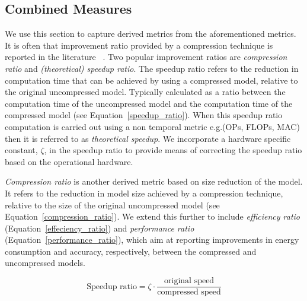 \subsection{Combined Measures} \label{combined_measures}
We use this section to capture derived metrics from the aforementioned metrics.%
%
It is often that improvement ratio provided by a compression technique is reported in the literature ~\cite{He2018,Blalock2018,Menghani2023}. Two popular improvement ratios are \textit{compression ratio} and \textit{(theoretical) speedup ratio}.
%
The speedup ratio refers to the reduction in computation time that can be achieved by using a compressed model, relative to the original uncompressed model. Typically calculated as a ratio between the computation time of the uncompressed model and the computation time of the compressed model (see Equation~\ref{speedup_ratio}). When this speedup ratio computation is carried out using a non temporal metric e.g.(OPs, FLOPs, MAC) then it is referred to as \textit{theoretical speedup}. 
We incorporate a hardware specific constant, $\zeta$, in the speedup ratio to provide means of correcting the speedup ratio based on the operational hardware. %

%
\textit{Compression ratio} is another derived metric based on size reduction of the model. It refers to the reduction in model size achieved by a compression technique, relative to the size of the original uncompressed model (see Equation~\ref{compression_ratio}). 
%
We extend this further to include \textit{efficiency ratio} (Equation~\ref{effeciency_ratio}) and \textit{performance ratio} (Equation~\ref{performance_ratio}), which aim at reporting improvements in  energy consumption and accuracy, respectively, between the compressed and uncompressed models.


\begin{equation}
  \text{Speedup ratio} =   \zeta \cdot\frac{\text{original speed}}{\text{compressed speed}}
  \label{speedup_ratio}
\end{equation}

